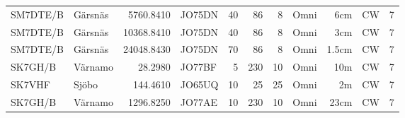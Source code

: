 \begin{longtable}{llrlrrrlrll}
	SM7DTE/B & Gärsnäs             &  5760.8410 & JO75DN &   40 &   86 &    8 & Omni    &   6cm & CW     & 7    \\
	SM7DTE/B & Gärsnäs             & 10368.8410 & JO75DN &   40 &   86 &    8 & Omni    &   3cm & CW     & 7    \\
	SM7DTE/B & Gärsnäs             & 24048.8430 & JO75DN &   70 &   86 &    8 & Omni    & 1.5cm & CW     & 7    \\
	SK7GH/B  & Värnamo             &    28.2980 & JO77BF &    5 &  230 &   10 & Omni    &   10m & CW     & 7    \\
	SK7VHF   & Sjöbo               &   144.4610 & JO65UQ &   10 &   25 &   25 & Omni    &    2m & CW     & 7    \\
	SK7GH/B  & Värnamo             &  1296.8250 & JO77AE &   10 &  230 &   10 & Omni    &  23cm & CW     & 7
\end{longtable}

